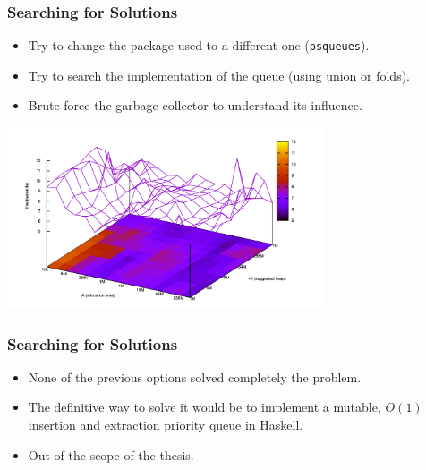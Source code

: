 \documentclass{beamer}
\begin{document}
\begin{frame}
  \frametitle{Searching for Solutions}
  \begin{itemize}
  \item Try to change the package used to a different one (\texttt{psqueues}).
  \item Try to search the implementation of the queue (using union or folds).
  \item Brute-force the garbage collector to understand its influence.
  \end{itemize}
  \centering
  \includegraphics[width=0.7\textwidth]{gc-tuning.png}
\end{frame}

\begin{frame}
  \frametitle{Searching for Solutions}
  \begin{itemize}
  \item None of the previous options solved completely the problem.
  \item The definitive way to solve it would be to implement a mutable, $O(1)$
    insertion and extraction priority queue in Haskell.
  \item Out of the scope of the thesis.
  \end{itemize}
\end{frame}
\end{document}
